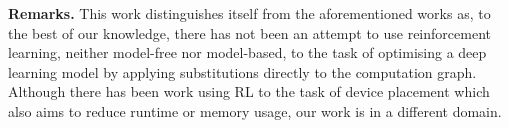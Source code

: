 \textbf{Remarks.} This work distinguishes itself from the aforementioned works as, to the best of our knowledge, there has not been an attempt to use reinforcement learning, neither model-free nor model-based, to the task of optimising a deep learning model by applying substitutions directly to the computation graph. Although there has been work using RL to the task of device placement \cite{addanki2019placeto, paliwal2020reinforced} which also aims to reduce runtime or memory usage, our work is in a different domain.

